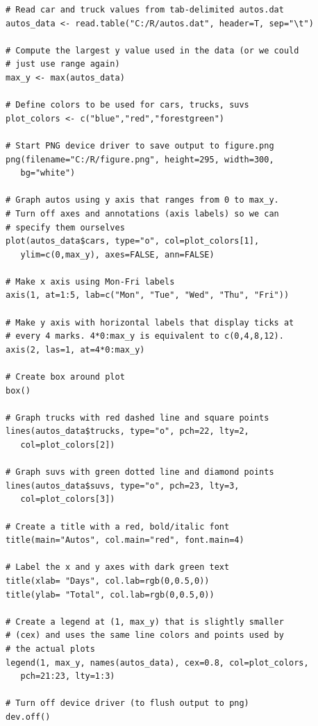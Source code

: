 \documentclass[10pt]{book}
\begin{document}
\begin{lstlisting}
# Read car and truck values from tab-delimited autos.dat
autos_data <- read.table("C:/R/autos.dat", header=T, sep="\t") 

# Compute the largest y value used in the data (or we could
# just use range again)
max_y <- max(autos_data)

# Define colors to be used for cars, trucks, suvs
plot_colors <- c("blue","red","forestgreen")

# Start PNG device driver to save output to figure.png
png(filename="C:/R/figure.png", height=295, width=300, 
   bg="white")

# Graph autos using y axis that ranges from 0 to max_y.
# Turn off axes and annotations (axis labels) so we can 
# specify them ourselves
plot(autos_data$cars, type="o", col=plot_colors[1], 
   ylim=c(0,max_y), axes=FALSE, ann=FALSE)

# Make x axis using Mon-Fri labels
axis(1, at=1:5, lab=c("Mon", "Tue", "Wed", "Thu", "Fri"))

# Make y axis with horizontal labels that display ticks at 
# every 4 marks. 4*0:max_y is equivalent to c(0,4,8,12).
axis(2, las=1, at=4*0:max_y)

# Create box around plot
box()

# Graph trucks with red dashed line and square points
lines(autos_data$trucks, type="o", pch=22, lty=2, 
   col=plot_colors[2])

# Graph suvs with green dotted line and diamond points
lines(autos_data$suvs, type="o", pch=23, lty=3, 
   col=plot_colors[3])

# Create a title with a red, bold/italic font
title(main="Autos", col.main="red", font.main=4)

# Label the x and y axes with dark green text
title(xlab= "Days", col.lab=rgb(0,0.5,0))
title(ylab= "Total", col.lab=rgb(0,0.5,0))

# Create a legend at (1, max_y) that is slightly smaller 
# (cex) and uses the same line colors and points used by 
# the actual plots
legend(1, max_y, names(autos_data), cex=0.8, col=plot_colors, 
   pch=21:23, lty=1:3)

# Turn off device driver (to flush output to png)
dev.off()
\end{lstlisting}
\end{document}
